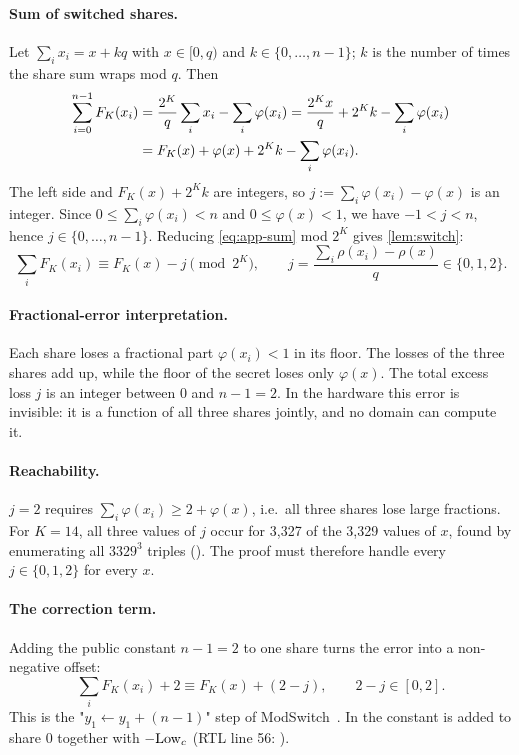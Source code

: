 \paragraph{Sum of switched shares.} Let $\sum_i x_i = x + kq$ with $x \in [0, q)$ and $k \in \{0, \dots, n-1\}$; $k$ is the number of times the share sum wraps mod $q$. Then
\begin{align}
  \sum_{i=0}^{n-1} F_K(x_i) &= \frac{2^K}{q}\sum_i x_i - \sum_i \varphi(x_i)
    = \frac{2^K x}{q} + 2^K k - \sum_i \varphi(x_i) \notag\\
  &= F_K(x) + \varphi(x) + 2^K k - \sum_i \varphi(x_i). \label{eq:app-sum}
\end{align}
The left side and $F_K(x) + 2^K k$ are integers, so $j := \sum_i \varphi(x_i) - \varphi(x)$ is an integer. Since $0 \le \sum_i \varphi(x_i) < n$ and $0 \le \varphi(x) < 1$, we have $-1 < j < n$, hence $j \in \{0, \dots, n-1\}$. Reducing \cref{eq:app-sum} mod $2^K$ gives \cref{lem:switch}:
\begin{equation}
  \sum_i F_K(x_i) \equiv F_K(x) - j \pmod{2^K}, \qquad j = \frac{\sum_i \rho(x_i) - \rho(x)}{q} \in \{0, 1, 2\}.\label{eq:app-lemma}
\end{equation}

\paragraph{Fractional-error interpretation.} Each share loses a fractional part $\varphi(x_i) < 1$ in its floor. The losses of the three shares add up, while the floor of the secret loses only $\varphi(x)$. The total excess loss $j$ is an integer between 0 and $n-1 = 2$. In the hardware this error is invisible: it is a function of all three shares jointly, and no domain can compute it.

\paragraph{Reachability.} $j = 2$ requires $\sum_i \varphi(x_i) \ge 2 + \varphi(x)$, i.e.\ all three shares lose large fractions. For $K = 14$, all three values of $j$ occur for 3,327 of the 3,329 values of $x$, found by enumerating all $3329^3$ triples (). The proof must therefore handle every $j \in \{0, 1, 2\}$ for every $x$.

\paragraph{The correction term.} Adding the public constant $n - 1 = 2$ to one share turns the error into a non-negative offset:
\begin{equation}
  \sum_i F_K(x_i) + 2 \equiv F_K(x) + (2 - j), \qquad 2 - j \in [0, 2].
\end{equation}
This is the "$y_1 \leftarrow y_1 + (n - 1)$" step of ModSwitch~\cite{coron2023dil}. In \PAMS{} the constant is added to share 0 together with $-\mathrm{Low}_c$ (RTL line 56: ).


